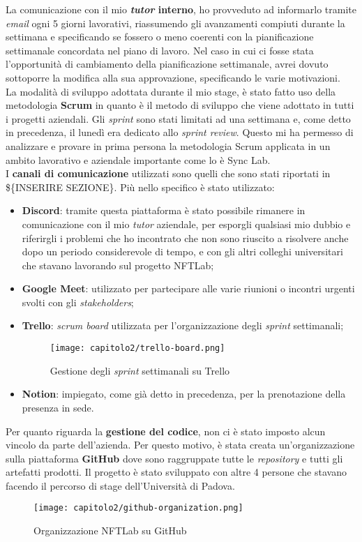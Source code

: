 La comunicazione con il mio \textbf{\emph{tutor} interno}, ho provveduto ad informarlo tramite \emph{email} ogni 5 giorni lavorativi, riassumendo gli avanzamenti compiuti durante la settimana e specificando se fossero o meno coerenti con la pianificazione settimanale concordata nel piano di lavoro. Nel caso in cui ci fosse stata l'opportunità di cambiamento della pianificazione settimanale, avrei dovuto sottoporre la modifica alla sua approvazione, specificando le varie motivazioni. \\

La modalità di sviluppo adottata durante il mio stage, è stato fatto uso della metodologia \textbf{Scrum} in quanto è il metodo di sviluppo che viene adottato in tutti i progetti aziendali. Gli \emph{sprint} sono stati limitati ad una settimana e, come detto in precedenza, il lunedì era dedicato allo \emph{sprint review}. Questo mi ha permesso di analizzare e provare in prima persona la metodologia Scrum applicata in un ambito lavorativo e aziendale importante come lo è Sync Lab. \\

I \textbf{canali di comunicazione} utilizzati sono quelli che sono stati riportati in \$\{INSERIRE SEZIONE\}. Più nello specifico è stato utilizzato:
\begin{itemize}
  \item \textbf{Discord}: tramite questa piattaforma è stato possibile rimanere in comunicazione con il mio \emph{tutor} aziendale, per esporgli qualsiasi mio dubbio e riferirgli i problemi che ho incontrato che non sono riuscito a risolvere anche dopo un periodo considerevole di tempo, e con gli altri colleghi universitari che stavano lavorando sul progetto NFTLab;
  \item \textbf{Google Meet}: utilizzato per partecipare alle varie riunioni o incontri urgenti svolti con gli \emph{stakeholders};
  \item \textbf{Trello}: \emph{scrum board} utilizzata per l'organizzazione degli \emph{sprint} settimanali;
  
  \clearpage
  \begin{figure}[!h]
    \centering
    \texttt{[image: capitolo2/trello-board.png]}
    \caption{Gestione degli \emph{sprint} settimanali su Trello}
  \end{figure}

  \item \textbf{Notion}: impiegato, come già detto in precedenza, per la prenotazione della presenza in sede.
\end{itemize}

Per quanto riguarda la \textbf{gestione del codice}, non ci è stato imposto alcun vincolo da parte dell'azienda. Per questo motivo, è stata creata un'organizzazione sulla piattaforma \textbf{GitHub} dove sono raggruppate tutte le \emph{repository} e tutti gli artefatti prodotti. Il progetto è stato sviluppato con altre 4 persone che stavano facendo il percorso di stage dell'Università di Padova.

\begin{figure}[!h]
  \centering
  \texttt{[image: capitolo2/github-organization.png]}
  \caption{Organizzazione NFTLab su GitHub}
\end{figure}
